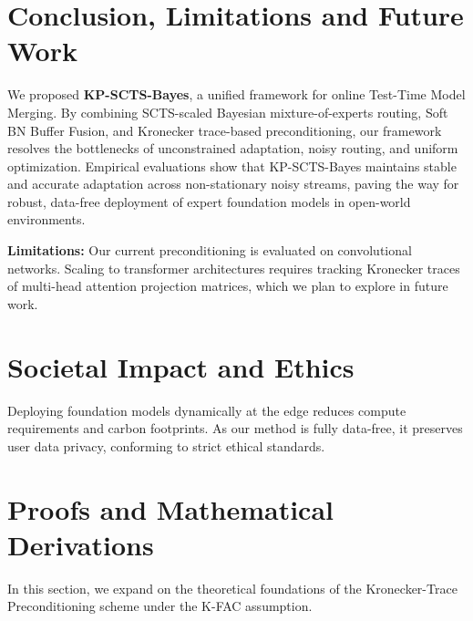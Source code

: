 \documentclass{article}
\theoremstyle{plain}
\theoremstyle{definition}
\theoremstyle{remark}
\begin{document}
\section{Conclusion, Limitations and Future Work}
\label{submission-sec:conclusion}
We proposed \textbf{KP-SCTS-Bayes}, a unified framework for online Test-Time Model Merging. By combining SCTS-scaled Bayesian mixture-of-experts routing, Soft BN Buffer Fusion, and Kronecker trace-based preconditioning, our framework resolves the bottlenecks of unconstrained adaptation, noisy routing, and uniform optimization. Empirical evaluations show that KP-SCTS-Bayes maintains stable and accurate adaptation across non-stationary noisy streams, paving the way for robust, data-free deployment of expert foundation models in open-world environments.

\textbf{Limitations:} Our current preconditioning is evaluated on convolutional networks. Scaling to transformer architectures requires tracking Kronecker traces of multi-head attention projection matrices, which we plan to explore in future work.

\section*{Societal Impact and Ethics}
Deploying foundation models dynamically at the edge reduces compute requirements and carbon footprints. As our method is fully data-free, it preserves user data privacy, conforming to strict ethical standards.

\clearpage



\clearpage
\appendix
\onecolumn
\section{Proofs and Mathematical Derivations}
\label{appendix:proofs}
In this section, we expand on the theoretical foundations of the Kronecker-Trace Preconditioning scheme under the K-FAC assumption.
\end{document}
